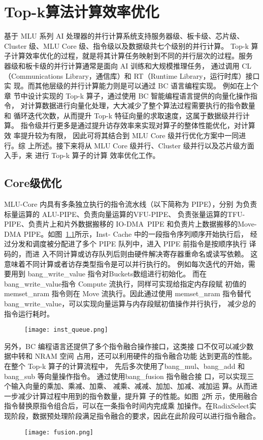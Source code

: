 \section{Top-k算法计算效率优化}
基于 MLU 系列 AI 处理器的并行计算系统支持服务器级、板卡级、芯片级、Cluster 级、MLU Core 级、指令级以及数据级共七个级别的并行计算。
Top-k 算 子计算效率优化的过程，就是将其计算任务映射到不同的并行层次的过程。服务 器级和板卡级的并行计算通常是面向 AI 训练和大规模推理任务，
通过调用 CL（Communications Library，通信库）和 RT（Runtime Library，运行时库）接口实 现。而其他层级的并行计算能力则是可以通过 BC 语言编程实现。
例如在上个章 节中设计实现的 Top-k 算子，通过使用 BC 智能编程语言提供的向量化操作指令， 对计算数据进行向量化处理，大大减少了整个算法过程需要执行的指令数量和
 循环迭代次数，从而提升 Top-k 特征向量的求取速度，这属于数据级并行计算。 指令级并行更多是通过提升访存效率来实现对算子的整体性能优化，对计算效 率提升较为有限，
 因此可将其结合到 MLU Core 级并行优化方案中一同进行。综 上所述。接下来将从 MLU Core 级并行、Cluster 级并行以及芯片级方面入手，来 进行 Top-k 算子的计算
 效率优化工作。

\subsection{Core级优化}
MLU-Core 内具有多条独立执行的指令流水线（以下简称为 PIPE），分别 为负责标量运算的 ALU-PIPE、负责向量运算的VFU-PIPE、
负责张量运算的TFU-PIPE、负责片上和片外数据搬移的 IO-DMA\ PIPE 和负责片上数据搬移的Move-DMA PIPE。如图~\ref{}所示，Inst-
Cache 中的一段指令序列顺序开始执行后， 经过分发和调度被分配进了多个 PIPE 队列中，进入 PIPE 前指令是按顺序执行 译码的，而进
入不同计算或访存队列后则由硬件解决寄存器重命名或读写依赖。 这意味着不同计算或者访存类型指令是可以并行执行的。
例如每次迭代的开始，需要用到 bang\_write\_value 指令对Buckets数组进行初始化。
而在bang\_write\_value指令 Compute 流执行，同样可实现给指定内存段赋 初值的
 memset\_nram 指令则在 Move 流执行。因此通过使用 memset\_nram 指令替代
 bang\_write\_value，可以实现向量运算与内存段赋初值操作并行执行，
 减少总的指令运行耗时。
\begin{figure}[ht]
    \centering
    \texttt{[image: inst\_queue.png]}
    \caption{}
    \label{fig:inst_queue}
\end{figure}

另外，BC 编程语言还提供了多个指令融合操作接口，这类接 口不仅可以减少数据中转和 NRAM 空间
占用，还可以利用硬件的指令融合功能 达到更高的性能。在整个 Top-k 算子的计算流程中，
先后多次使用了bang\_mul、bang\_add 和 bang\_sub 等向量操作指令。
通过使用bang\_fusion 指令融合接 口，可以实现三个输入向量的乘加、乘减、加乘、
减乘、减减、加加、加减、减加运 算。从而进一步减少计算过程中用到的指令数量，提升算
子的性能。如图~\ref{fig:fusion}所 示，使用融合指令替换原指令组合后，可以在一条指令时间内完成乘
加操作。在RadixSelect实现阶段，数据预处理阶段满足指令融合的要求，因此在此阶段可以进行指令融合。
\begin{figure}[ht]
    \centering
    \texttt{[image: fusion.png]}
    \caption{}
    \label{fig:fusion}
\end{figure}

